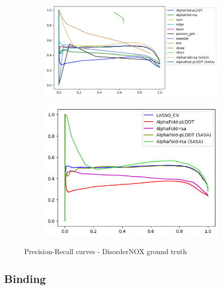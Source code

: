 \begin{figure}[h!]
    \begin{subfigure}{1.1\linewidth}
        \includegraphics[width=\linewidth]{res/ML/precisionrecall-disordernox-total.png}
    \end{subfigure}
    
    \begin{subfigure}{0.8\linewidth}
        \includegraphics[width=\linewidth]{res/ML/precisionrecall-disordernox.png}
    \end{subfigure}
    \caption{Precision-Recall curves - DisorderNOX ground truth}
\end{figure}

\pagebreak
\pagebreak
\subsection{Binding}

